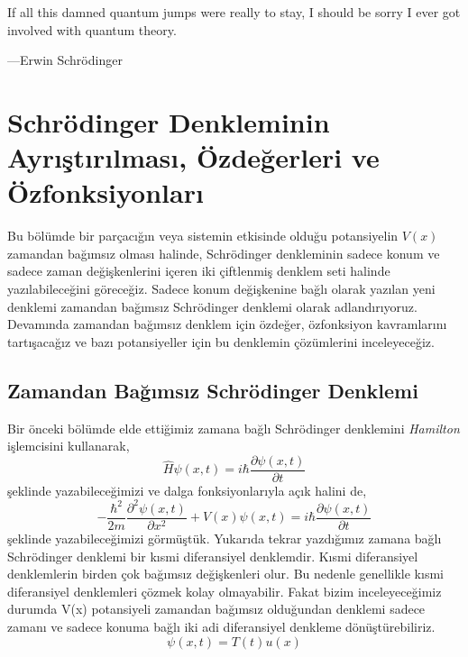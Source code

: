 \documentclass[00_kitap.tex]{subfiles}
\begin{document}
	\BolumKaynakcaBaslat

{
\hspace{.5\textwidth}
\begin{minipage}{.5\textwidth}
\raggedleft
If all this damned quantum jumps were really to stay, I should be
sorry I ever got involved with quantum theory.

—Erwin Schrödinger
\cite{book:Ficek}

\end{minipage}
}

\setcounter{section}{2} %
\section{Schrödinger Denkleminin Ayrıştırılması, Özdeğerleri ve Özfonksiyonları}

Bu bölümde bir parçacığın veya sistemin etkisinde olduğu potansiyelin $V(x)$ zamandan bağımsız olması halinde, Schrödinger denkleminin sadece konum ve sadece zaman değişkenlerini içeren iki çiftlenmiş denklem seti halinde yazılabileceğini göreceğiz. Sadece konum değişkenine bağlı olarak yazılan yeni denklemi zamandan bağımsız Schrödinger denklemi olarak adlandırıyoruz. Devamında zamandan bağımsız denklem için özdeğer, özfonksiyon kavramlarını tartışacağız ve bazı potansiyeller için bu denklemin çözümlerini inceleyeceğiz. 

\subsection{Zamandan Bağımsız Schrödinger Denklemi}
Bir önceki bölümde elde ettiğimiz zamana bağlı Schrödinger denklemini \emph{Hamilton} işlemcisini kullanarak,
\begin{equation}
\hat H \psi ( x , t ) = i \hbar \frac { \partial \psi ( x , t ) } { \partial t }
\label{eq:time_depended_schrodinger_eq_op_form}
\end{equation}
şeklinde yazabileceğimizi ve dalga fonksiyonlarıyla açık halini de, 
\begin{equation}
- \frac { \hbar ^ { 2 } } { 2 m } \frac { \partial ^ { 2 } \psi ( x , t ) } { \partial x ^ { 2 } } + V ( x ) \psi ( x , t ) = i \hbar \frac { \partial \psi ( x , t ) } { \partial t }
\label{eq:time_depended_schrodinger_eq}
\end{equation}
şeklinde yazabileceğimizi görmüştük.  Yukarıda tekrar yazdığımız zamana bağlı Schrödinger denklemi  bir kısmi diferansiyel denklemdir.  Kısmi diferansiyel denklemlerin birden çok bağımsız değişkenleri olur.   Bu nedenle genellikle  kısmi diferansiyel denklemleri çözmek kolay olmayabilir.  Fakat bizim inceleyeceğimiz durumda V(x)  potansiyeli zamandan bağımsız olduğundan denklemi sadece zamanı ve sadece konuma bağlı iki adi diferansiyel denkleme    dönüştürebiliriz. 
\begin{equation}
\psi ( x , t ) = T ( t ) u ( x )
\label{eq:separation_of_wave_func}
\end{equation}
\end{document}
